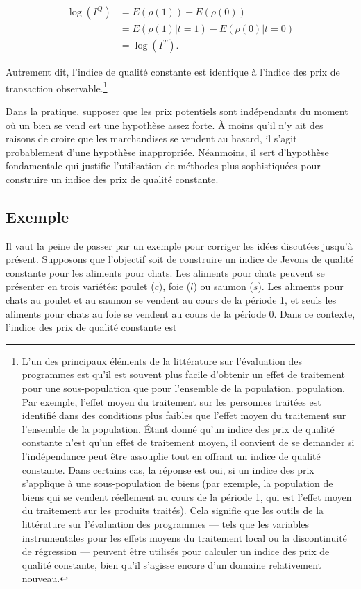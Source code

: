 \documentclass[]{article}
\begin{document}
\begin{align*}
\log (I^{Q}) &= E(\rho(1)) - E(\rho(0)) \\
&= E(\rho(1) | t = 1) - E(\rho(0) | t = 0) \\
&= \log (I^{T}).
\end{align*}

Autrement dit, l'indice de qualité constante est identique à l'indice des prix de transaction observable.\footnote{L'un des principaux éléments de la littérature sur l'évaluation des programmes est qu'il est souvent plus facile d'obtenir un effet de traitement pour une sous-population que pour l'ensemble de la population. population. Par exemple, l'effet moyen du traitement sur les personnes traitées est identifié dans des conditions plus faibles que l'effet moyen du traitement sur l'ensemble de la population. Étant donné qu'un indice des prix de qualité constante n'est qu'un effet de traitement moyen, il convient de se demander si l'indépendance peut être assouplie tout en offrant un indice de qualité constante. Dans certains cas, la réponse est oui, si un indice des prix s'applique à une sous-population de biens (par exemple, la population de biens qui se vendent réellement au cours de la période 1, qui est l'effet moyen du traitement sur les produits traités). Cela signifie que les outils de la littérature sur l'évaluation des programmes --- tels que les variables instrumentales pour les effets moyens du traitement local ou la discontinuité de régression --- peuvent être utilisés pour calculer un indice des prix de qualité constante, bien qu'il s'agisse encore d'un domaine relativement nouveau.}

Dans la pratique, supposer que les prix potentiels sont indépendants du moment où un bien se vend est une hypothèse assez forte. À moins qu'il n'y ait des raisons de croire que les marchandises se vendent au hasard, il s'agit probablement d'une hypothèse inappropriée. Néanmoins, il sert d'hypothèse fondamentale qui justifie l'utilisation de méthodes plus sophistiquées pour construire un indice des prix de qualité constante.

\hypertarget{exemple}{%
\subsection{Exemple}\label{exemple}}

Il vaut la peine de passer par un exemple pour corriger les idées discutées jusqu'à présent. Supposons que l'objectif soit de construire un indice de Jevons de qualité constante pour les aliments pour chats. Les aliments pour chats peuvent se présenter en trois variétés: poulet (\(c\)), foie (\(l\)) ou saumon (\(s\)). Les aliments pour chats au poulet et au saumon se vendent au cours de la période 1, et seuls les aliments pour chats au foie se vendent au cours de la période 0. Dans ce contexte, l'indice des prix de qualité constante est
\end{document}
